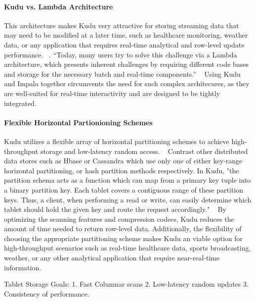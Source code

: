 \paragraph{Kudu vs. Lambda Architecture}
This architecture makes Kudu very attractive for storing streaming data that may need to be modified at a later time, such as healthcare monitoring, weather data, or any application that requires real-time analytical and row-level update performance. ~\cite{hid-sp18-407-kudu-schema-design}. ``Today, many users try to solve this challenge via a Lambda architecture, which presents inherent challenges by requiring different code bases and storage for the necessary batch and real-time components.'' ~\cite{hid-sp18-407-kudu-impala-integration} Using Kudu and Impala together circumvents the need for such complex architecures, as they are well-suited for real-time interactivity and are designed to be tightly integrated.

\paragraph{Flexible Horizontal Partionioning Schemes}
Kudu utilizes a flexible array of horizontal partitioning schemes to achieve high-throughput storage and low-latency random access. ~\cite{hid-sp18-407-kudu-intro} Contrast other distributed data stores such as Hbase or Cassandra which use only one of either key-range horizontal partitioning, or hash partition methods respectively. In Kudu, "the partition schema acts as a function which can map from a primary key tuple into a binary
partition key.  Each tablet covers a contiguous  range  of  these partition keys. Thus,  a client, when performing a read or write, can easily determine which tablet should hold the given key and route the request accordingly." ~\cite{hid-sp18-407-kudu-intro} By optimizing the scanning features and compression codecs, Kudu reduces the amount of time needed to return row-level data. Additionally, the flexibility of choosing the appropriate partitioning scheme makes Kudu an viable option for high-throughput scenarios such as real-time healthcare data, sports broadcasting, weather, or any other analytical application that require near-real-time information.

\begin{enumerate}
Tablet Storage Goals: 
1. Fast Columnar scans
2. Low-latency random updates
3. Consistency of performance.
\end{enumerate}

